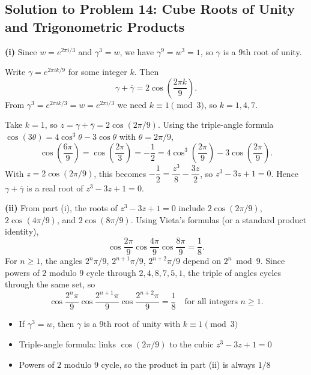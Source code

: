 \subsection{Solution to Problem 14: Cube Roots of Unity and Trigonometric Products}

\begin{solution}
\textbf{(i)} Since $w = e^{2\pi i/3}$ and $\gamma^3 = w$, we have $\gamma^9 = w^3 = 1$, so $\gamma$ is a 9th root of unity.

Write $\gamma = e^{2\pi ik/9}$ for some integer $k$. Then
\[
\gamma + \overline{\gamma} = 2\cos\!\left(\frac{2\pi k}{9}\right).
\]
From $\gamma^3 = e^{2\pi ik/3} = w = e^{2\pi i/3}$ we need $k \equiv 1 \pmod{3}$, so $k = 1, 4, 7$.

Take $k=1$, so $z = \gamma + \overline{\gamma} = 2\cos(2\pi/9)$. Using the triple-angle formula $\cos(3\theta) = 4\cos^3\theta - 3\cos\theta$ with $\theta = 2\pi/9$,
\[
\cos\!\left(\frac{6\pi}{9}\right) = \cos\!\left(\frac{2\pi}{3}\right) = -\frac{1}{2}
= 4\cos^3\!\left(\frac{2\pi}{9}\right) - 3\cos\!\left(\frac{2\pi}{9}\right).
\]
With $z = 2\cos(2\pi/9)$, this becomes $-\dfrac{1}{2} = \dfrac{z^3}{8} - \dfrac{3z}{2}$, so $z^3 - 3z + 1 = 0$. Hence $\gamma + \overline{\gamma}$ is a real root of $z^3 - 3z + 1 = 0$.

\textbf{(ii)} From part (i), the roots of $z^3 - 3z + 1 = 0$ include $2\cos(2\pi/9)$, $2\cos(4\pi/9)$, and $2\cos(8\pi/9)$. Using Vieta's formulas (or a standard product identity),
\[
\cos\!\frac{2\pi}{9}\cos\!\frac{4\pi}{9}\cos\!\frac{8\pi}{9} = \frac{1}{8}.
\]
For $n \ge 1$, the angles $2^n\pi/9$, $2^{n+1}\pi/9$, $2^{n+2}\pi/9$ depend on $2^n \bmod 9$. Since powers of $2$ modulo $9$ cycle through $2,4,8,7,5,1$, the triple of angles cycles through the same set, so
\[
\cos\!\frac{2^n\pi}{9}\cos\!\frac{2^{n+1}\pi}{9}\cos\!\frac{2^{n+2}\pi}{9} = \frac{1}{8}
\quad \text{for all integers } n \ge 1.
\]
\end{solution}

\begin{takeaways}
\begin{itemize}
    \item If $\gamma^3 = w$, then $\gamma$ is a 9th root of unity with $k \equiv 1 \pmod{3}$
    \item Triple-angle formula: links $\cos(2\pi/9)$ to the cubic $z^3-3z+1=0$
    \item Powers of $2$ modulo $9$ cycle, so the product in part (ii) is always $1/8$
\end{itemize}
\end{takeaways}
